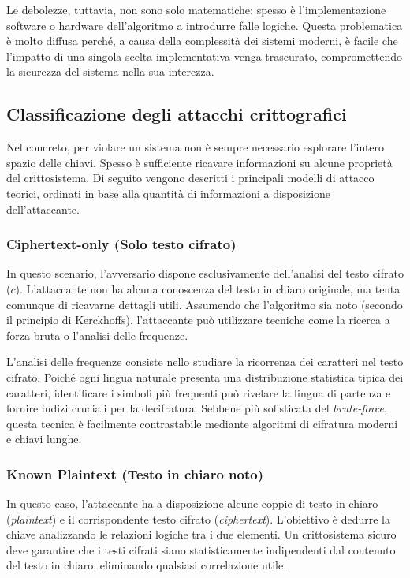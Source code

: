 Le debolezze, tuttavia, non sono solo matematiche: spesso è l'implementazione software o hardware dell'algoritmo a introdurre falle logiche. Questa problematica è molto diffusa perché, a causa della complessità dei sistemi moderni, è facile che l'impatto di una singola scelta implementativa venga trascurato, compromettendo la sicurezza del sistema nella sua interezza.


\subsection{Classificazione degli attacchi crittografici}\label{subsec:classificazione_attacchi}
Nel concreto, per violare un sistema non è sempre necessario esplorare l'intero spazio delle chiavi. Spesso è sufficiente ricavare informazioni su alcune proprietà del crittosistema. Di seguito vengono descritti i principali modelli di attacco teorici, ordinati in base alla quantità di informazioni a disposizione dell'attaccante.

\subsubsection{Ciphertext-only (Solo testo cifrato)}\label{subsubsec:ciphertext_only}
In questo scenario, l'avversario dispone esclusivamente dell'analisi del testo cifrato ($c$). L'attaccante non ha alcuna conoscenza del testo in chiaro originale, ma tenta comunque di ricavarne dettagli utili. Assumendo che l'algoritmo sia noto (secondo il principio di Kerckhoffs), l'attaccante può utilizzare tecniche come la ricerca a forza bruta o l'analisi delle frequenze.

L'analisi delle frequenze consiste nello studiare la ricorrenza dei caratteri nel testo cifrato. Poiché ogni lingua naturale presenta una distribuzione statistica tipica dei caratteri, identificare i simboli più frequenti può rivelare la lingua di partenza e fornire indizi cruciali per la decifratura. Sebbene più sofisticata del \textit{brute-force}, questa tecnica è facilmente contrastabile mediante algoritmi di cifratura moderni e chiavi lunghe.

\subsubsection{Known Plaintext (Testo in chiaro noto)}\label{subsubsec:known_plaintext}
In questo caso, l'attaccante ha a disposizione alcune coppie di testo in chiaro (\textit{plaintext}) e il corrispondente testo cifrato (\textit{ciphertext}). L'obiettivo è dedurre la chiave analizzando le relazioni logiche tra i due elementi. Un crittosistema sicuro deve garantire che i testi cifrati siano statisticamente indipendenti dal contenuto del testo in chiaro, eliminando qualsiasi correlazione utile.

